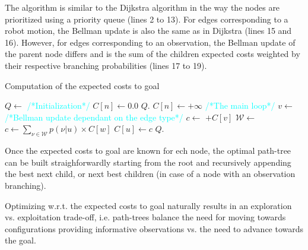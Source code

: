 \documentclass[letterpaper, 10 pt, conference]{ieeeconf}  %
\begin{document}
The algorithm is similar to the Dijkstra algorithm \cite{Sniedovich2006DijkstrasAR} in the way the nodes are prioritized using a priority queue (lines 2 to 13). For edges corresponding to a robot motion, the Bellman update is also the same as in Dijkstra (lines 15 and 16). However, for edges corresponding to an observation, the Bellman update of the parent node differs and is the sum of the children expected costs weighted by their respective branching probabilities (lines 17 to 19).
\begin{algorithm}[H]
\caption{Computation of the expected costs to goal}
\label{alg:expected_costs}
\begin{algorithmic}[1]
	\State $Q \gets $ 
	\State \textcolor{cyan}{\footnotesize/*Initialization*/}
			\State $C[n] \gets 0.0$
			\State $Q$.
		\Else
			\State $C[n] \gets +\infty$
		\EndIf
	\EndFor
	\State \textcolor{cyan}{\footnotesize/*The main loop*/}
		\State $v \gets$ 
			\State \textcolor{cyan}{\footnotesize/*Bellman update dependant on the edge type*/}
				\State $c \gets$ $+ C[v]$
				\State $\mathcal{W} \gets $ 
				\State $c \gets \sum_{\nu \in \mathcal{W}}{ p(\nu | u) \times C[w]} $
			\EndIf
				\State $C[u] \gets c$
				\State $Q$.
			\EndIf
		\EndFor
	\EndWhile
\EndFunction
\end{algorithmic}
\end{algorithm}

Once the expected costs to goal are known for ech node, the optimal path-tree can be built straighforwardly starting from the root and recursively appending the best next child, or next best children (in case of a node with an observation branching).

Optimizing w.r.t. the expected costs to goal naturally results in an exploration vs. exploitation trade-off, i.e. path-trees balance the need for moving towards configurations  providing informative observations vs. the need to advance towards the goal.
\end{document}
